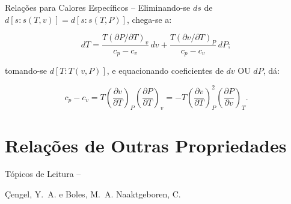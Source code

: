 \begin{frame}[allowframebreaks]{Relações para Calores Específicos --}
        \pagebreak
        Eliminando-se $ds$ de $d[s\!:\!s(T, v)] = d[s\!:\!s(T, P)]$, chega-se a:

        \begin{equation*}
            dT =
                \frac{T(\partial P/\partial T)_v}{c_p - c_v}\,dv +
                \frac{T(\partial v/\partial T)_P}{c_p - c_v}\,dP;
        \end{equation*}

        \noindent tomando-se $d[T:T(v, P)]$, e equacionando coeficientes de $dv$ OU $dP$, dá:

        \begin{equation*}
            c_p - c_v =
                T\left(
                    \frac{\partial v}{\partial T}
                \right)_P
                \left(
                    \frac{\partial P}{\partial T}
                \right)_v =
                -T\left(
                    \frac{\partial v}{\partial T}
                \right)_P^2
                \left(
                    \frac{\partial P}{\partial v}
                \right)_T.
        \end{equation*}

    \end{frame}

\section{Relações de Outras Propriedades}

    \begin{frame}[allowframebreaks]{Tópicos de Leitura --}
        \begin{thebibliography}{Çengel, Y.~A., 2013}
                Çengel, Y.~A. e Boles, M.~A.
                Naaktgeboren, C.
        \end{thebibliography}
    \end{frame}




